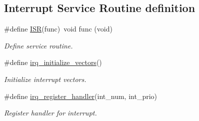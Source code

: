 \subsection*{Interrupt Service Routine definition}
\begin{DoxyCompactItemize}
\item 
\#define \mbox{\hyperlink{group__interrupt__group_ga0da0a19156773eca7070722f26ff66a6}{I\+SR}}(func)~void func (void)
\begin{DoxyCompactList}\small\item\em Define service routine. \end{DoxyCompactList}\item 
\#define \mbox{\hyperlink{group__interrupt__group_ga931b667f6490ad3d8905fa25bebb24b1}{irq\+\_\+initialize\+\_\+vectors}}()
\begin{DoxyCompactList}\small\item\em Initialize interrupt vectors. \end{DoxyCompactList}\item 
\#define \mbox{\hyperlink{group__interrupt__group_gaa746642b1132af054826fb169f541965}{irq\+\_\+register\+\_\+handler}}(int\+\_\+num,  int\+\_\+prio)
\begin{DoxyCompactList}\small\item\em Register handler for interrupt. \end{DoxyCompactList}\end{DoxyCompactItemize}
